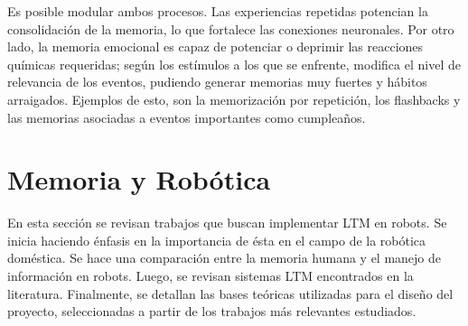 Es posible modular ambos procesos. Las experiencias repetidas potencian la consolidación de la memoria, lo que fortalece las conexiones neuronales. Por otro lado, la memoria emocional es capaz de potenciar o deprimir las reacciones químicas requeridas; según los estímulos a los que se enfrente, modifica el nivel de relevancia de los eventos, pudiendo generar memorias muy fuertes y hábitos arraigados. Ejemplos de esto, son la memorización por repetición, los flashbacks y las memorias asociadas a eventos importantes como cumpleaños.









\section{Memoria y Robótica}\label{sec:robotic_memory}

En esta sección se revisan trabajos que buscan implementar LTM en robots. Se inicia haciendo énfasis en la importancia de ésta en el campo de la robótica doméstica. Se hace una comparación entre la memoria humana y el manejo de información en robots. Luego, se revisan sistemas LTM encontrados en la literatura. Finalmente, se detallan las bases teóricas utilizadas para el diseño del proyecto, seleccionadas a partir de los trabajos más relevantes estudiados.



